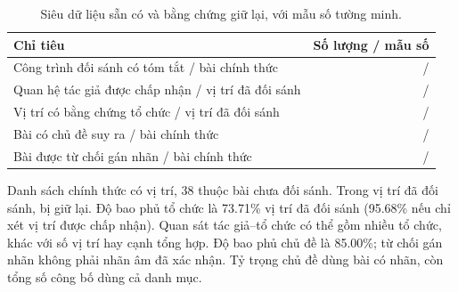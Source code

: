 \begin{table}[!htbp]\centering\small
\caption{Siêu dữ liệu sẵn có và bằng chứng giữ lại, với mẫu số tường minh.}\label{tab:coverage}
\begin{tabularx}{\textwidth}{Yr}\toprule
Chỉ tiêu & Số lượng / mẫu số\\\midrule
Công trình đối sánh có tóm tắt / bài chính thức & \MatchedWorks{} / \Papers{}\\
Quan hệ tác giả được chấp nhận / vị trí đã đối sánh & \AcceptedAuthorships{} / \MatchedPositions{}\\
Vị trí có bằng chứng tổ chức / vị trí đã đối sánh & \AffiliatedPositions{} / \MatchedPositions{}\\
Bài có chủ đề suy ra / bài chính thức & \LabeledPapers{} / \Papers{}\\
Bài được từ chối gán nhãn / bài chính thức & \AbstainedPapers{} / \Papers{}\\\bottomrule
\end{tabularx}\end{table}

Danh sách chính thức có \OfficialPositions{} vị trí, 38 thuộc bài chưa đối sánh.
Trong \MatchedPositions{} vị trí đã đối sánh, \WithheldAuthorships{} bị giữ lại.
Độ bao phủ tổ chức là 73.71\% vị trí đã đối sánh (95.68\% nếu chỉ xét vị trí
được chấp nhận). Quan sát tác giả--tổ chức có thể gồm nhiều tổ chức, khác với
số vị trí hay cạnh tổng hợp. Độ bao phủ chủ đề là 85.00\%; từ chối gán nhãn
không phải nhãn âm đã xác nhận. Tỷ trọng chủ đề dùng bài có nhãn, còn tổng số
công bố dùng cả danh mục.
